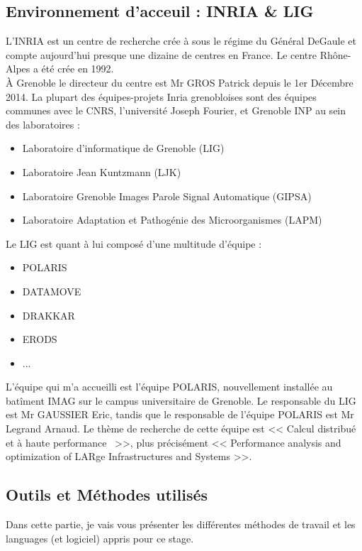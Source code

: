 \documentclass[a4paper,12pt]{article}
\begin{document}
{	\subsection{Environnement d'acceuil : INRIA \& LIG}
	\indent L’INRIA est un centre de recherche cr\'e{}e \`a sous le r\'e{}gime du Général DeGaule et compte aujourd’hui presque une dizaine de centres en France. Le centre Rhône-Alpes a été crée en 1992.\\
	\indent \`A Grenoble le directeur du centre est Mr GROS Patrick depuis le 1er Décembre 2014. La plupart des \'e{}quipes-projets Inria grenobloises sont des \'e{}quipes communes avec le CNRS, l’université Joseph Fourier, et Grenoble INP au sein des laboratoires :
    \begin{itemize}
        \item Laboratoire d’informatique de Grenoble (LIG)
        \item Laboratoire Jean Kuntzmann (LJK)
        \item Laboratoire Grenoble Images Parole Signal Automatique (GIPSA)
        \item Laboratoire Adaptation et Pathogénie des Microorganismes (LAPM)
    \end{itemize}
    Le LIG est quant \`a lui compos\'e d'une multitude d'équipe :
    \begin{itemize}
        \item POLARIS
        \item DATAMOVE
        \item DRAKKAR
        \item ERODS
        \item ...
    \end{itemize}
	\indent \indent L'\'e{}quipe qui m'a accueilli est l'\'e{}quipe POLARIS, nouvellement install\'e{}e au bat\^iment IMAG sur le campus universitaire de Grenoble. Le responsable du LIG est Mr GAUSSIER Eric, tandis que le responsable de l'\'e{}quipe POLARIS est Mr Legrand Arnaud. Le thème de recherche de cette \'e{}quipe est << Calcul distribu\'e et \`a haute performance~ >>, plus pr\'e{}cis\'e{}ment << Performance analysis and optimization of LARge Infrastructures and Systems >>.
	\subsection{Outils et Méthodes utilis\'e{}s}
	\indent Dans cette partie, je vais vous pr\'e{}senter les diff\'e{}rentes m\'e{}thodes de travail et les languages (et logiciel) appris pour ce stage.
}
\end{document}
